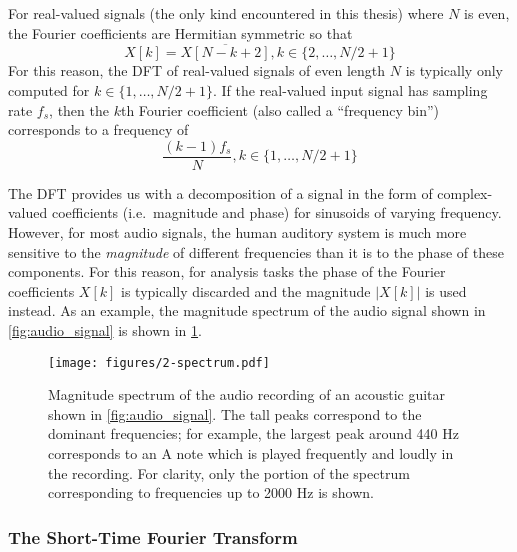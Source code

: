 For real-valued signals (the only kind encountered in this thesis) where $N$ is even, the Fourier coefficients are Hermitian symmetric so that
\begin{equation}
        X[k] = \overline{X[N - k + 2]}, k \in \{2, \ldots, N/2 + 1\}
\end{equation}
For this reason, the DFT of real-valued signals of even length $N$ is typically only computed for $k \in \{1, \ldots, N/2 + 1\}$.
If the real-valued input signal has sampling rate $f_s$, then the $k$th Fourier coefficient (also called a ``frequency bin'') corresponds to a frequency of
\begin{equation}
        \frac{(k - 1)f_s}{N}, k \in \{1, \ldots, N/2 + 1\}
        \label{eq:bin_freq}
\end{equation}

The DFT provides us with a decomposition of a signal in the form of complex-valued coefficients (i.e.\ magnitude and phase) for sinusoids of varying frequency.
However, for most audio signals, the human auditory system is much more sensitive to the {\em magnitude} of different frequencies than it is to the phase of these components.
For this reason, for analysis tasks the phase of the Fourier coefficients $X[k]$ is typically discarded and the magnitude $|X[k]|$ is used instead.
As an example, the magnitude spectrum of the audio signal shown in \cref{fig:audio_signal} is shown in \cref{fig:spectrum}.

\begin{figure}
  \centering
  \texttt{[image: figures/2-spectrum.pdf]}
  \caption[Magnitude spectrum of the acoustic guitar recording]{Magnitude spectrum of the audio recording of an acoustic guitar shown in \cref{fig:audio_signal}.
  The tall peaks correspond to the dominant frequencies; for example, the largest peak around 440 Hz corresponds to an A note which is played frequently and loudly in the recording.
  For clarity, only the portion of the spectrum corresponding to frequencies up to 2000 Hz is shown.}
  \label{fig:spectrum}
\end{figure}

\subsubsection{The Short-Time Fourier Transform}

